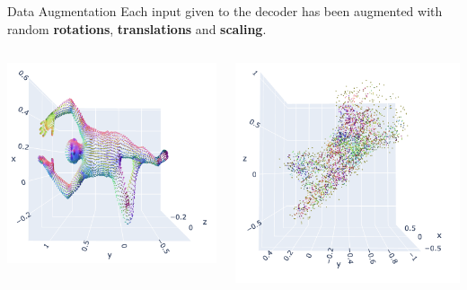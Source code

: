 \documentclass{beamer}
\begin{document}
\begin{frame}{Data Augmentation}
  Each input given to the decoder has been augmented with random \textbf{rotations}, \textbf{translations} and \textbf{scaling}.
  
  \vspace{1em}

  \begin{columns}[T]
      \centering
      \includegraphics[width=0.9\linewidth, height=0.6\linewidth, keepaspectratio=false]{../Media/example/registration.png}

      \centering
      \hspace{1em}
      \includegraphics[width=0.84\linewidth]{../Media/example/augmented_noisy_cloud.png}
  \end{columns}
  
  \end{frame}
\end{document}

